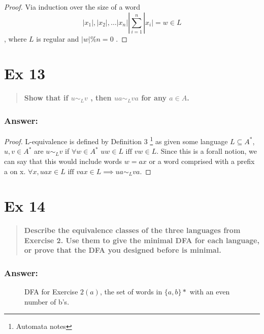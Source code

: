 \documentclass[titlepage]{article}\usepackage[]{graphicx}\usepackage[]{color}
\begin{document}
\begin{proof}
  Via induction over the size of a word 
  \[ |x_1|, |x_2|, \dots |x_n| | \sum_{i=1}^n |x_i| = w \in L \]
  , where $L$ is regular and $|w|\%n=0 $ .

\end{proof}




\section*{Ex 13}
\begin{quote}
  \textbf{Show that if $u \sim_L v$ , then $u a \sim_L v a$ for any $a \in A$.}
\end{quote}
\subsubsection{Answer:}

\begin{proof}
L-equivalence is defined by Definition 3 \footnote{Automata notes} as given some
language $L \subseteq A^*$, $u,v \in A^*$ are $u \sim_L v$ if $\forall w \in
A^*\, \, uw \in L \text{ iff } vw \in L$. 
Since this is a forall notion, we can say that this would include words $w = ax$
or a word comprised with a prefix a on x. $\forall x, uax \in L \text{ iff } vax \in
L \implies ua \sim_L va$.
\end{proof}


\section*{Ex 14}
\begin{quote}
  \textbf{Describe the equivalence classes of the three languages from Exercise
  2. Use them to give the minimal DFA for each language, or prove that the DFA
  you designed before is minimal.}
\end{quote}
\subsubsection{Answer:}
  \begin{figure}[htp]
    \centering
    \caption{DFA for Exercise $2(a)$, the set of words in $\{a,b\}* $ with an
            even number of b's.}
  \end{figure}
\end{document}
